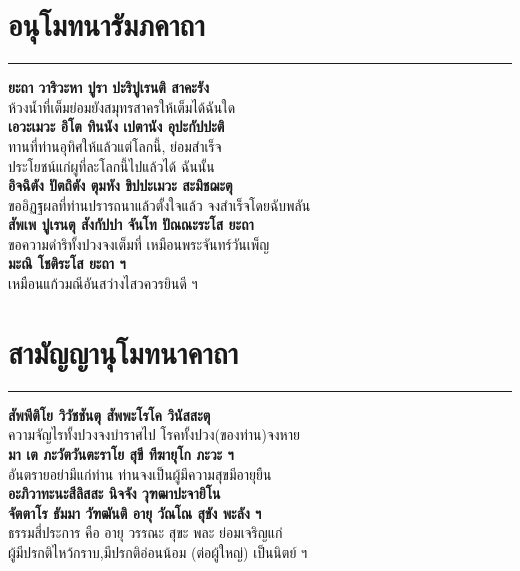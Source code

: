 \documentclass[12pt]{article}
\begin{document}
\pagebreak
\vspace*{\fill}
\begin{center}
\end{center}
\vspace{\fill}
\pagebreak

\section{อนุโมทนารัมภคาถา}
\hrule
\textbf{ยะถา วาริวะหา ปูรา ปะริปูเรนติ สาคะรัง}\\
\indent ห้วงน้ำที่เต็มย่อมยังสมุทรสาครให้เต็มได้ฉันใด\\
\textbf{เอวะเมวะ อิโต ทินนัง เปตานัง อุปะกัปปะติ}\\
\indent ทานที่ท่านอุทิศให้แล้วแต่โลกนี้, ย่อมสำเร็จ\\
\indent ประโยชน์แก่ผูที่ละโลกนี้ไปแล้วได้ ฉันนั้น\\
\textbf{อิจฉิตัง ปัตถิตัง ตุมหัง ขิปปะเมวะ สะมิชฌะตุ}\\
\indent ขออิฏฐผลที่ท่านปรารถนาแล้วตั้งใจแล้ว จงสำเร็จโดยฉับพลัน\\
\textbf{สัพเพ ปูเรนตุ สังกัปปา จันโท ปัณณะระโส ยะถา}\\
\indent ขอความดำริทั้งปวงจงเต็มที่ เหมือนพระจันทร์วันเพ็ญ\\
\textbf{มะณิ โชติระโส ยะถา ฯ}\\
\indent เหมือนแก้วมณีอันสว่างไสวควรยินดี ฯ

\pagebreak
\section{สามัญญานุโมทนาคาถา}
\hrule
\textbf{สัพพีติโย วิวัชชันตุ สัพพะโรโค วินัสสะตุ}\\
\indent ความจัญไรทั้งปวงจงบำราศไป โรคทั้งปวง(ของท่าน)จงหาย\\
\textbf{มา เต ภะวัตวันตะราโย สุขี ทีฆายุโก ภะวะ ฯ}\\
\indent อันตรายอย่ามีแก่ท่าน ท่านจงเป็นผู้มีความสุขมีอายุยืน\\
\textbf{อะภิวาทะนะสีลิสสะ นิจจัง วุฑฒาปะจายิโน\\
จัตตาโร ธัมมา วัฑฒันติ  อายุ วัณโณ สุขัง พะลัง ฯ}\\
\indent ธรรมสี่ประการ คือ อายุ วรรณะ สุขะ พละ ย่อมเจริญแก่\\
\indent ผู้มีปรกติไหว้กราบ,มีปรกติอ่อนน้อม (ต่อผู้ใหญ่) เป็นนิตย์ ฯ\\

\pagebreak
\end{document}
